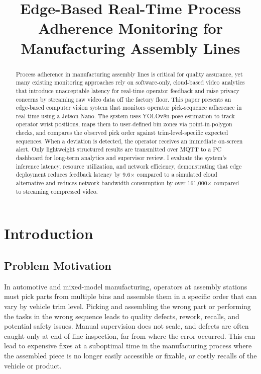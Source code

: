 \documentclass[conference]{IEEEtran}
\begin{document}
\title{Edge-Based Real-Time Process Adherence Monitoring for Manufacturing Assembly Lines}

\author{
}

\maketitle

\begin{abstract}
Process adherence in manufacturing assembly lines is critical for quality assurance, yet many existing monitoring approaches rely on software-only, cloud-based video analytics that introduce unacceptable latency for real-time operator feedback and raise privacy concerns by streaming raw video data off the factory floor. This paper presents an edge-based computer vision system that monitors operator pick-sequence adherence in real time using a Jetson Nano. The system uses YOLOv8n-pose estimation to track operator wrist positions, maps them to user-defined bin zones via point-in-polygon checks, and compares the observed pick order against trim-level-specific expected sequences. When a deviation is detected, the operator receives an immediate on-screen alert. Only lightweight structured results are transmitted over MQTT to a PC dashboard for long-term analytics and supervisor review. I evaluate the system's inference latency, resource utilization, and network efficiency, demonstrating that edge deployment reduces feedback latency by 9.6$\times$ compared to a simulated cloud alternative and reduces network bandwidth consumption by over 161{,}000$\times$ compared to streaming compressed video.
\end{abstract}

\section{Introduction}

\subsection{Problem Motivation}
In automotive and mixed-model manufacturing, operators at assembly stations must pick parts from multiple bins and assemble them in a specific order that can vary by vehicle trim level. Picking and assembling the wrong part or performing the tasks in the wrong sequence leads to quality defects, rework, recalls, and potential safety issues. Manual supervision does not scale, and defects are often caught only at end-of-line inspection, far from where the error occurred. This can lead to expensive fixes at a suboptimal time in the manufacturing process where the assembled piece is no longer easily accessible or fixable, or costly recalls of the vehicle or product.
\end{document}
